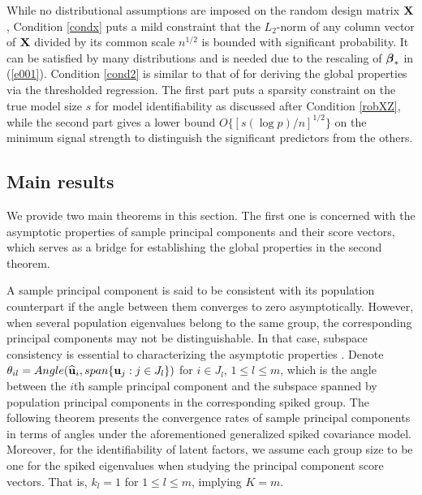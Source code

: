 \documentclass{statsoc}
\newcommand{\bu}{\mbox{\bf u}}
\newcommand{\bX}{\mbox{\bf X}}
\newcommand{\bbeta}{\mbox{\boldmath $\beta$}}
\begin{document}
While no distributional assumptions are imposed on the random design matrix $\bX$, Condition \ref{condx} puts a mild constraint that the $L_2$-norm of any column vector of $\bX$ divided by its common scale $n^{1/2}$ is bounded with significant probability. It can be satisfied by many distributions and is needed due to the rescaling of $\bbeta_{\ast}$ in (\ref{e001}). Condition \ref{cond2} is similar to that of \cite{Zheng2014} for deriving the global properties via the thresholded regression. The first part puts a sparsity constraint on the true model size $s$ for model identifiability as discussed after Condition \ref{robXZ}, while the second part gives a lower bound $O\{[s (\log p) / n]^{1/2}\}$ on the minimum signal strength to distinguish the significant predictors from the others.





\subsection{Main results} \label{Sec4.2}

We provide two main theorems in this section. The first one is concerned with the asymptotic properties of sample principal components and their score vectors, which serves as a bridge for establishing the global properties in the second theorem.

A sample principal component is said to be consistent with its population counterpart if the angle between them converges to zero asymptotically. However, when several population eigenvalues belong to the same group, the corresponding principal components may not be distinguishable. In that case, subspace consistency is essential to characterizing the asymptotic properties \citep{Jung2009}. Denote $\theta_{il} = Angle(\widehat{\bu}_i, span\{\bu_j: j \in J_l\})$ for $i \in J_l$, $1 \leq l \leq m$, which is the angle between the $i$th sample principal component and the subspace spanned by population principal components in the corresponding spiked group. The following theorem presents the convergence rates of sample principal components in terms of angles under the aforementioned generalized spiked covariance model. Moreover, for the identifiability of latent factors, we assume each group size to be one for the spiked eigenvalues when studying the principal component score vectors. That is, $k_l = 1$ for $1 \leq l \leq m$, implying $K = m$. %
\end{document}
